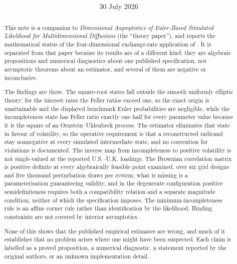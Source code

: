 \documentclass[11pt]{article}
\title{\textbf{\papertitle}}
\author{\authorname\\[0.2em]\small\affiliation\\[0.1em]\small\email\quad\textperiodcentered\quad\orcid\draftlabel}
\date{30 July 2026}
\theoremstyle{definition}
\begin{document}
\maketitle

\begin{abstract}
This note is a companion to \emph{Dimensional Asymptotics of Euler-Based Simulated Likelihood for
Multidimensional Diffusions} (the ``theory paper''), and reports the mathematical status of the
four-dimensional exchange-rate application of \citet{BrandtSantaClara2002}. It is separated from
that paper because its results are of a different kind: they are algebraic propositions and
numerical diagnostics about one published specification, not asymptotic theorems about an
estimator, and several of them are negative or inconclusive.

The findings are these. The square-root states fall outside the smooth uniformly elliptic theory;
for the interest rates the Feller ratios exceed one, so the exact origin is unattainable and the
displayed benchmark Euler probabilities are negligible, while the incompleteness state has Feller
ratio exactly one half for every parameter value because it is the square of an Ornstein--Uhlenbeck
process. The estimator eliminates that state in favour of volatility, so the operative requirement
is that a reconstructed radicand stay nonnegative at every simulated intermediate state, and no
convention for violations is documented. The inverse map from incompleteness to positive volatility
is not single-valued at the reported U.S.--U.K. loadings. The Brownian correlation matrix is
positive definite at every algebraically feasible point examined, over six grid designs and five
thousand perturbation draws per system; what is missing is a parameterisation guaranteeing validity,
and in the degenerate configuration positive semidefiniteness requires both a compatibility relation
and a separate magnitude condition, neither of which the specification imposes. The
minimum-incompleteness rule is an affine corner rule rather than identification by the likelihood.
Binding constraints are not covered by interior asymptotics.

None of this shows that the published empirical estimates are wrong, and much of it establishes that
no problem arises where one might have been suspected. Each claim is labelled as a proved
proposition, a numerical diagnostic, a statement reported by the original authors, or an unknown
implementation detail.
\end{abstract}
\end{document}
